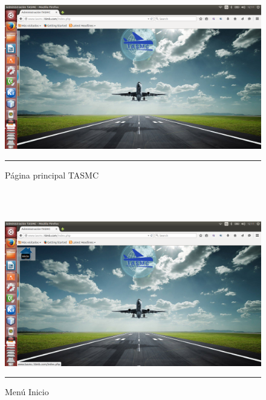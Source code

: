\begin{figure}[h!]
	\centering
		\includegraphics[width=1\textwidth]{Figuras/index.png}
		\rule{35em}{0.5pt}
	\caption[Página principal TASMC]{Página principal TASMC}
	\label{fig:indexWeb}
\end{figure}
\\
\\
\begin{figure}[h!]
	\centering
		\includegraphics[width=1\textwidth]{Figuras/indexhome.png}
		\rule{35em}{0.5pt}
	\caption[Menú Inicio]{Menú Inicio}
	\label{fig:menuInicio}
\end{figure}
\clearpage

